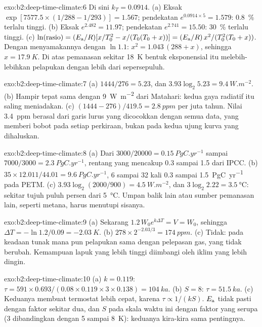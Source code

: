 \begin{solution}{exo:b2:deep-time-climate:6}
Di sini $k_T = 0.0914$. (a) Eksak $\exp[7577.5\times(1/288 - 1/293)] = 1.567$; pendekatan
$e^{0.0914\times5} = 1.579$: \qty{0.8}{\percent} terlalu tinggi. (b) Eksak $e^{2.482} = 11.97$;
pendekatan $e^{2.741} = 15.50$: \qty{30}{\percent} terlalu tinggi. (c) $\ln(\text{rasio}) = (E_{\text
a}/R)[x/T_0^2 - x/(T_0(T_0 + x))] = (E_{\text a}/R)\,x^2/(T_0^2(T_0 + x))$. Dengan menyamakannya dengan $\ln1.1$:
$x^2 = 1.043\,(288 + x)$, sehingga $x = \qty{17.9}{K}$. Di atas pemanasan sekitar \qty{18}{K}
bentuk eksponensial itu melebih-lebihkan pelapukan dengan lebih dari sepersepuluh.
\end{solution}

\begin{solution}{exo:b2:deep-time-climate:7}
(a) $1444/276 = 5.23$, dan $3.93\log_2 5.23 = \qty{9.4}{W.m^{-2}}$. (b) Hampir tepat sama dengan
\qty{9}{W.m^{-2}} dari Matahari: kedua gaya radiatif itu saling meniadakan. (c) $(1444 - 276)/419.5 =
\qty{2.8}{ppm}$ per juta tahun. Nilai \qty{3.4}{ppm} berasal dari garis lurus yang dicocokkan dengan semua
data, yang memberi bobot pada setiap perkiraan, bukan pada kedua ujung kurva yang dihaluskan.
\end{solution}

\begin{solution}{exo:b2:deep-time-climate:8}
(a) Dari $3000/20000 = \qty{0.15}{PgC.yr^{-1}}$ sampai $7000/3000 = \qty{2.3}{PgC.yr^{-1}}$, rentang
yang mencakup 0.3 sampai 1.5 dari IPCC. (b) $35\times12.011/44.01 = \qty{9.6}{PgC.yr^{-1}}$, 6 sampai
32 kali 0.3 sampai \qty{1.5}{PgC.yr^{-1}} pada PETM. (c) $3.93\log_2(2000/900) = \qty{4.5}{W.m^{-2}}$,
dan $3\log_2 2.22 = \qty{3.5}{\celsius}$: sekitar tujuh puluh persen dari \qty{5}{\celsius}. Umpan balik
lain atau sumber pemanasan lain, seperti metana, harus menutupi sisanya.
\end{solution}

\begin{solution}{exo:b2:deep-time-climate:9}
(a) Sekarang $1.2\,W_0e^{k\Delta T} = V = W_0$, sehingga $\Delta T = -\ln 1.2/0.09 = \qty{-2.03}{K}$.
(b) $278\times2^{-2.03/3} = \qty{174}{ppm}$. (c) Tidak: pada keadaan tunak mana pun pelapukan sama dengan
pelepasan gas, yang tidak berubah. Kemampuan lapuk yang lebih tinggi diimbangi oleh iklim yang lebih dingin.
\end{solution}

\begin{solution}{exo:b2:deep-time-climate:10}
(a) $k = 0.119$: $\tau = 591\times0.693/(0.08\times0.119\times3\times0.138) = \qty{104}{ka}$.
(b) $S = 8$: $\tau = \qty{51.5}{ka}$. (c) Keduanya membuat termostat lebih cepat, karena $\tau \propto
1/(kS)$. $E_{\text a}$ tidak pasti dengan faktor sekitar dua, dan $S$ pada skala waktu ini dengan faktor
yang serupa (3 dibandingkan dengan 5 sampai \qty{8}{K}): keduanya kira-kira sama pentingnya.
\end{solution}

